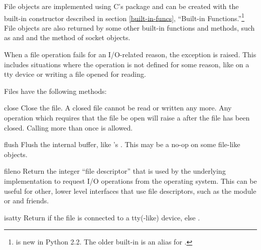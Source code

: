 File objects are implemented using C's 
package and can be created with the built-in constructor
 described in section
\ref{built-in-funcs}, ``Built-in Functions.''\footnote{
is new in Python 2.2.  The older built-in  is an
alias for .}
File objects are also returned
by some other built-in functions and methods, such as
 and  and the
 method of socket objects.

When a file operation fails for an I/O-related reason, the exception
 is raised.  This includes situations where the
operation is not defined for some reason, like  on a tty
device or writing a file opened for reading.

Files have the following methods:


\begin{methoddesc}[file]{close}{}
  Close the file.  A closed file cannot be read or written any more.
  Any operation which requires that the file be open will raise a
   after the file has been closed.  Calling
   more than once is allowed.
\end{methoddesc}

\begin{methoddesc}[file]{flush}{}
  Flush the internal buffer, like 's
  .  This may be a no-op on some file-like
  objects.
\end{methoddesc}

\begin{methoddesc}[file]{fileno}{}
  Return the integer ``file descriptor'' that is used by the
  underlying implementation to request I/O operations from the
  operating system.  This can be useful for other, lower level
  interfaces that use file descriptors, such as the
   module or
   and friends.  
\end{methoddesc}

\begin{methoddesc}[file]{isatty}{}
  Return  if the file is connected to a tty(-like) device, else
  .  
\end{methoddesc}

